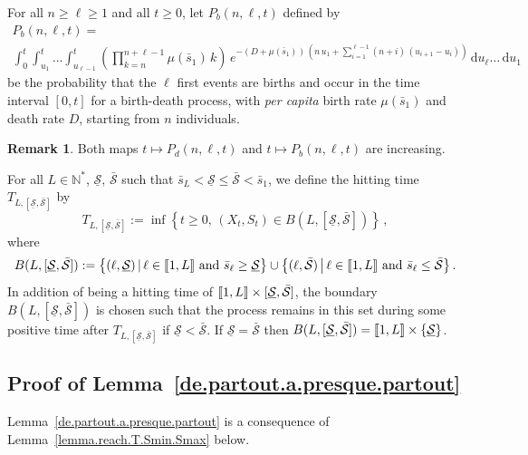 \documentclass[10pt]{amsart}
\theoremstyle{definition}\newtheorem{defi}[theo]{Definition}\newtheorem{rema}[theo]{Remark}\newtheorem{exam}[theo]{Example}\newtheorem{exem}[theo]{Example}\newtheorem{nota}[theo]{Notation}
\newcommand{\llbracket}{\mathopen{[\mkern -2.7mu[}}
\newcommand{\rrbracket}{\mathclose{]\mkern -2.7mu]}}
\newcommand{\NN}{\mathbb{N}}
\newcommand{\dif}{\mathrm{d}}
\newcommand{\Smin}{\underline{\mathcal{S}}}
\newcommand{\Smax}{\bar{\mathcal{S}}}
\newcommand{\barmu}{\mu(\bar s_1)}
\newcommand{\1}{\mathbf{1}}
\begin{document}
For all $n\geq \ell\geq 1$ and all $t\geq0$, let $P_b(n,\ell,t)$ defined by
\begin{multline*}
P_b(n,\ell,t) =\\
\int_0^{t} \int_{u_1}^{t}\dots \int_{u_{\ell-1}}^{t}
\left(\prod_{k=n}^{n+\ell-1}\barmu\,k\right)\, e^{-(D+\barmu)\,\left(n\,u_1+
\sum\limits_{i=1}^{\ell-1}(n+i)\,(u_{i+1}-u_{i})\right)}\,
\dif u_\ell \dots\,\dif u_1
\end{multline*}
be the probability that the $\ell$ first events are births and occur in the time interval $[0,t]$ for a birth-death process, with \emph{per capita} birth rate $\barmu$ and death rate $D$, starting from $n$ individuals.


\begin{rema}\label{rk.Pd.Pb.inc}
Both maps $t\mapsto P_d(n,\ell,t)$ and $t\mapsto P_b(n,\ell,t)$ are increasing.
\end{rema}

For all $L\in\NN^*$, $\Smin,\, \Smax$ such that $\bar s_L<\Smin \leq \Smax<\bar s_1$, we define the hitting time $T_{L,[\Smin,\Smax]}$ by
\[
T_{L,[\Smin,\Smax]}:=\inf\left\{t\geq 0,\, (X_t,S_t)\in B(L,[\Smin,\Smax])\right\}\,,
\]
where
\[
B(L,[\Smin,\Smax]):=\big\{(\ell,\Smin) \, | \, \ell \in \llbracket 1,L \rrbracket \text{ and } \bar s_\ell \geq \Smin\big\} \cup 
\big\{(\ell,\Smax) \, \big| \, \ell \in \llbracket 1,L \rrbracket \text{ and } \bar s_\ell \leq \Smax\big\}\,.
\]
In addition of being a hitting time of $\llbracket 1, L \rrbracket \times [\Smin,\Smax]$, the boundary $B(L,[\Smin,\Smax])$ is chosen such that the process remains in this set during some positive time after $T_{L,[\Smin,\Smax]}$ if $\Smin<\Smax$. If $\Smin=\Smax$ then $B(L,[\Smin,\Smax])=\llbracket 1,L \rrbracket \times \{\Smin\}$.



\subsection{Proof of Lemma~\ref{de.partout.a.presque.partout}}\label{sec:partout.a.partout}


Lemma~\ref{de.partout.a.presque.partout} is a consequence of Lemma~\ref{lemma.reach.T.Smin.Smax} below.
\end{document}
